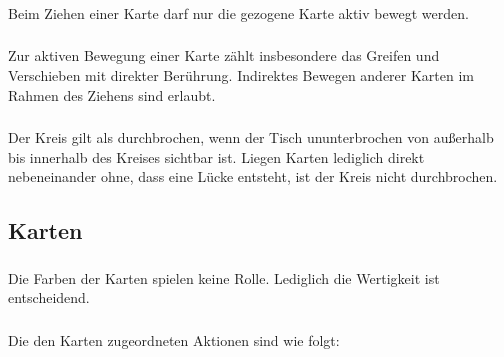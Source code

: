 \subsubsection{}
Beim Ziehen einer Karte darf nur die gezogene Karte aktiv bewegt werden.

\subsubsection{}
Zur aktiven Bewegung einer Karte zählt insbesondere das Greifen und Verschieben mit direkter Berührung. Indirektes Bewegen anderer Karten im Rahmen des Ziehens sind erlaubt.

\subsubsection{}
Der Kreis gilt als durchbrochen, wenn der Tisch ununterbrochen von außerhalb bis innerhalb des Kreises sichtbar ist. Liegen Karten lediglich direkt nebeneinander ohne, dass eine Lücke entsteht, ist der Kreis nicht durchbrochen.

\subsection{Karten}\label{Ring_of_Fire:Karten}
\subsubsection{}
Die Farben der Karten spielen keine Rolle. Lediglich die Wertigkeit ist entscheidend.

\subsubsection{}
Die den Karten zugeordneten Aktionen sind wie folgt:

